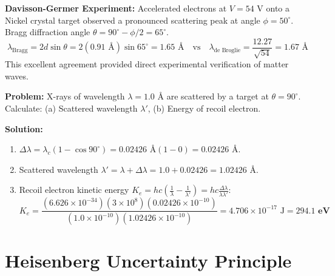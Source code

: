 \documentclass[12pt,a4paper]{article}
\begin{document}
\textbf{Davisson-Germer Experiment:} Accelerated electrons at $V = 54\text{ V}$ onto a Nickel crystal target observed a pronounced scattering peak at angle $\phi = 50^\circ$.
Bragg diffraction angle $\theta = 90^\circ - \phi/2 = 65^\circ$.
\begin{equation}
\lambda_{\text{Bragg}} = 2 d \sin\theta = 2(0.91\text{ \AA}) \sin 65^\circ = \mathbf{1.65\text{ \AA}} \quad \text{vs} \quad \lambda_{\text{de Broglie}} = \frac{12.27}{\sqrt{54}} = \mathbf{1.67\text{ \AA}}
\end{equation}
This excellent agreement provided direct experimental verification of matter waves.

\begin{tcolorbox}[examplebox, title={\textbf{Solved Problem 1: Compton Shift at 90 Degrees}}]
\textbf{Problem:} X-rays of wavelength $\lambda = 1.0\text{ \AA}$ are scattered by a target at $\theta = 90^\circ$. Calculate: (a) Scattered wavelength $\lambda'$, (b) Energy of recoil electron.

\textbf{Solution:}\par\noindent
\begin{enumerate}[leftmargin=*, itemsep=2pt]
  \item $\Delta \lambda = \lambda_c (1 - \cos 90^\circ) = 0.02426\text{ \AA} (1 - 0) = 0.02426\text{ \AA}$.
  \item Scattered wavelength $\lambda' = \lambda + \Delta \lambda = 1.0 + 0.02426 = \mathbf{1.02426\text{ \AA}}$.
  \item Recoil electron kinetic energy $K_e = h c \left(\frac{1}{\lambda} - \frac{1}{\lambda'}\right) = h c \frac{\Delta\lambda}{\lambda \lambda'}$:
   \begin{equation}
   K_e = \frac{(6.626 \times 10^{-34}) (3 \times 10^8) (0.02426 \times 10^{-10})}{(1.0 \times 10^{-10}) (1.02426 \times 10^{-10})} = 4.706 \times 10^{-17}\text{ J} = \mathbf{294.1\text{ eV}}
   \end{equation}
\end{enumerate}
\end{tcolorbox}

\section{Heisenberg Uncertainty Principle}
\end{document}
